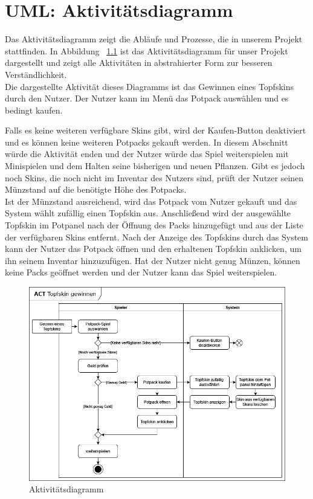 \chapter{UML: Aktivitätsdiagramm}\label{ch:uml_act}
Das Aktivitätsdiagramm zeigt die Abläufe und Prozesse, die in unserem Projekt stattfinden.
In Abbildung ~\ref{fig:act} ist das Aktivitätsdiagramm für unser Projekt dargestellt und zeigt alle Aktivitäten in 
abstrahierter Form zur besseren Verständlichkeit. \\
\newline
Die dargestellte Aktivität dieses Diagramms ist das Gewinnen eines Topfskins durch den Nutzer.
Der Nutzer kann im Menü das Potpack auswählen und es bedingt kaufen.

Falls es keine weiteren verfügbare Skins gibt, wird der Kaufen-Button deaktiviert und es können keine weiteren
Potpacks gekauft werden.
In diesem Abschnitt würde die Aktivität enden und der Nutzer würde das Spiel weiterspielen mit Minispielen und dem 
Halten seine bisherigen und neuen Pflanzen.
Gibt es jedoch noch Skins, die noch nicht im Inventar des Nutzers sind, prüft der Nutzer seinen Münzstand auf die 
benötigte Höhe des Potpacks.\\
Ist der Münzstand ausreichend, wird das Potpack vom Nutzer gekauft und das System wählt zufällig einen Topfskin aus.
Anschließend wird der ausgewählte Topfskin im Potpanel nach der Öffnung des Packs hinzugefügt und aus der Liste der
verfügbaren Skins entfernt. 
Nach der Anzeige des Topfskins durch das System kann der Nutzer das Potpack öffnen und den erhaltenen Topfskin anklicken, 
um ihn seinem Inventar hinzuzufügen.
Hat der Nutzer nicht genug Münzen, können keine Packs geöffnet werden und der Nutzer kann das Spiel weiterspielen.\\

\begin{figure}[h]
    \centering
    \includegraphics[width=0.8\linewidth]{../bilder/act_potpack}
    \vspace{0.05cm}
    \caption{Aktivitätsdiagramm}
    \label{fig:act}
\end{figure}